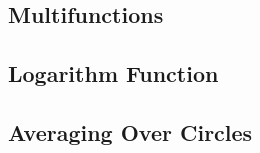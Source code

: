 \begin{card}
    \subsection{Multifunctions}

    \begin{compactdesc}
    \item[]
    \end{compactdesc}
\end{card}




\begin{card}
    \subsection{Logarithm Function}

    \begin{compactdesc}
    \item[]
    \end{compactdesc}
\end{card}




\begin{card}
    \subsection{Averaging Over Circles}

    \begin{compactdesc}
    \item[]
    \end{compactdesc}
\end{card}




